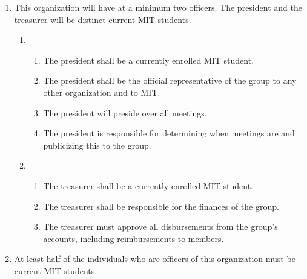 \documentclass[12pt]{article}
\begin{document}
\begin{enumerate}
    \item This organization will have at a minimum two officers. The president and the treasurer will be distinct current MIT students.
    \begin{enumerate}
        \item {}
        \begin{enumerate}
            \item The president shall be a currently enrolled MIT student.
            
            \item The president shall be the official representative of the group to any other organization and to MIT.
            
            \item The president will preside over all meetings.
            
            \item The president is responsible for determining when meetings are and publicizing this to the group.
        \end{enumerate}

        \item {}
        \begin{enumerate}
            \item The treasurer shall be a currently enrolled MIT student.
            
            \item The treasurer shall be responsible for the finances of the group.
            
            \item The treasurer must approve all disbursements from the group’s accounts, including reimbursements to members.
        \end{enumerate}
    \end{enumerate}

    \item At least half of the individuals who are officers of this organization must be current MIT students.
\end{enumerate}
\end{document}
